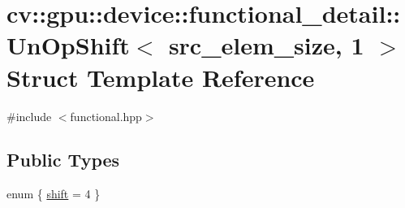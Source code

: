 \hypertarget{structcv_1_1gpu_1_1device_1_1functional__detail_1_1UnOpShift_3_01src__elem__size_00_011_01_4}{\section{cv\-:\-:gpu\-:\-:device\-:\-:functional\-\_\-detail\-:\-:Un\-Op\-Shift$<$ src\-\_\-elem\-\_\-size, 1 $>$ Struct Template Reference}
\label{structcv_1_1gpu_1_1device_1_1functional__detail_1_1UnOpShift_3_01src__elem__size_00_011_01_4}
}


{\ttfamily \#include $<$functional.\-hpp$>$}

\subsection*{Public Types}
\begin{DoxyCompactItemize}
\item 
enum \{ \hyperlink{structcv_1_1gpu_1_1device_1_1functional__detail_1_1UnOpShift_3_01src__elem__size_00_011_01_4_a29cc8c236cacabe567b27f62e450f44aa0f29212c7e5accd6613c4c0ecffaf708}{shift} = 4
 \}
\end{DoxyCompactItemize}


